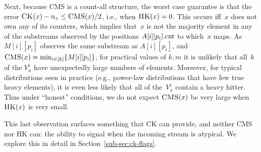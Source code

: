 Next, because CMS is a count-all structure, the worst case guarantee is that the error $\textnormal{\textsc{CK}}(x)-n_x \leq \textnormal{\textsc{CMS}}(x)/2$, i.e., when $\textnormal{\textsc{HK}}(x)=0$.  This occurs iff~$x$ does not own any of its counters, which implies that~$x$ is not the majority element in any of the substreams observed by the positions $A[i][p_i].\textup{cnt}$ to which~$x$ maps. 
As $M[i][p_i]$ observes the same substream as $A[i][p_i]$, and $\CMS(x)=\allowdisplaybreaks\min_{i \in [k]}\{M[i][p_i]\}$, for practical values of $k,m$ it is unlikely that all~$k$ of the $V^i_x$ have unexpectedly large numbers of elements.  Moreover, for typical distributions seen in practice (e.g., power-law distributions that have few true heavy elements), it is even less likely that all of the~$V^i_x$ contain a heavy hitter.  Thus under ``honest'' conditions, we do not expect $\textnormal{\textsc{CMS}}(x)$ be very large when $\textnormal{\textsc{HK}}(x)$ is very small.

This last observation surfaces something that CK can provide, and neither CMS nor HK can: the ability to signal when the incoming stream is atypical. We explore this in detail in Section~\ref{sub-sec:ck-flags}.



